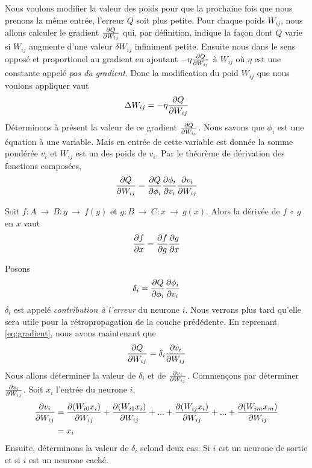 Nous voulons modifier la valeur des poids pour que la prochaine fois que nous prenons la même entrée, l'erreur $Q$ soit plus petite.
Pour chaque poids $W_{ij}$, nous allons calculer le gradient $\frac{\partial Q}{\partial W_{ij}}$ qui, par définition, indique la façon dont $Q$ varie si $W_{ij}$ augmente d'une valeur $\delta W_{ij}$ infiniment petite.
Ensuite nous  dans le sens opposé et proportionel au gradient en ajoutant $-\eta\frac{\partial Q}{\partial W_{ij}}$ à $W_{ij}$ où $\eta$ est une constante appelé \emph{pas du gradient}.
Donc la modification du poid $W_{ij}$ que nous voulons appliquer vaut
\begin{equation}\label{eq:Delta}
 \Delta W_{ij} = -\eta\frac{\partial Q}{\partial W_{ij}}
\end{equation}
Déterminons à présent la valeur de ce gradient $\frac{\partial Q}{\partial W_{ij}}$.
Nous savons que $\phi_i$ est une équation à une variable.
Mais en entrée de cette variable est donnée la somme pondérée $v_i$ et $W_{ij}$ est un des poids de $v_i$.
Par le théorème de dérivation des fonctions composées,
\begin{equation}\label{eq:gradient}
 \frac{\partial Q}{\partial W_{ij}} = \frac{\partial Q}{\partial \phi_i} \frac{\partial \phi_i}{\partial v_i} \frac{\partial v_i}{\partial W_{ij}}
\end{equation}
\begin{thm}
Soit $f:A~\rightarrow~B : y~\rightarrow~f(y)$ et $g:B~\rightarrow~C : x~\rightarrow~g(x)$. Alors la dérivée de $f~\circ~g$ en $x$ vaut
\[\frac{\partial f}{\partial x} = \frac{\partial f}{\partial g} \frac{\partial g}{\partial x}\]
\end{thm}
Posons
\begin{equation}\label{eq:deltai}
 \delta_i = \frac{\partial Q}{\partial \phi_i} \frac{\partial \phi_i}{\partial v_i}
\end{equation}
$\delta_i$ est appelé \emph{contribution à l'erreur} du neurone $i$.
Nous verrons plus tard qu'elle sera utile pour la rétropropagation de la couche prédédente.
En reprenant \eqref{eq:gradient}, nous avons maintenant que
\begin{equation}\label{eq:graddelta}
 \frac{\partial Q}{\partial W_{ij}} = \delta_i \frac{\partial v_i}{\partial W_{ij}}
\end{equation}
Nous allons déterminer la valeur de $\delta_i$ et de $\frac{\partial v_i}{\partial W_{ij}}$.
Commençons par déterminer $\frac{\partial v_i}{\partial W_{ij}}$.
Soit $x_i$ l'entrée du neurone $i$,
\begin{equation}\label{eq:gradsum}
 \begin{split}
  \frac{\partial v_i}{\partial W_{ij}} & = \frac{\partial (W_{i0}x_i)}{\partial W_{ij}} + \frac{\partial (W_{i1}x_i)}{\partial W_{ij}} + ... + \frac{\partial (W_{ij}x_i)}{\partial W_{ij}} + ... + \frac{\partial (W_{im}x_m)}{\partial W_{ij}}\\
  ~ & = x_i
  \end{split}
\end{equation}
Ensuite, déterminons la valeur de $\delta_i$ selond deux cas: Si $i$ est un neurone de sortie et si $i$ est un neurone caché.\\

